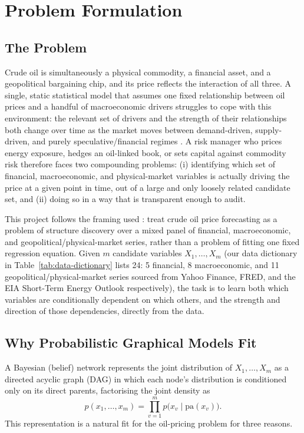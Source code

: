 \section{Problem Formulation}
\label{sec:problem-formulation}

\subsection{The Problem}

Crude oil is simultaneously a physical commodity, a financial asset, and a
geopolitical bargaining chip, and its price reflects the interaction of all
three. A single, static statistical model that assumes one fixed relationship
between oil prices and a handful of macroeconomic drivers struggles to cope
with this environment: the relevant set of drivers and the strength of their relationships both change over time as the market
moves between demand-driven, supply-driven, and purely speculative/financial
regimes \autocite{kilian2009oil,hamilton2009causes}. A risk manager who prices
energy exposure, hedges an oil-linked book, or sets capital against commodity
risk therefore faces two compounding problems: (i) identifying which set of financial, macroeconomic, and physical-market variables is actually
driving the price at a given point in time, out of a large and only loosely
related candidate set, and (ii) doing so in a way that is transparent enough
to audit.

This project follows the framing used \cite{alvi2018pgm}: treat crude oil price forecasting as a problem of structure discovery over a mixed panel of financial, macroeconomic, and geopolitical/physical-market series, rather than a problem of fitting one fixed regression equation. Given
$m$ candidate variables $X_1, \ldots, X_m$ (our data dictionary in Table~\ref{tab:data-dictionary} lists 24: 5 financial, 8 macroeconomic, and 11 geopolitical/physical-market series sourced from Yahoo Finance, FRED, and the EIA Short-Term Energy Outlook respectively), the task is to learn both which variables are conditionally dependent on which others, and the strength and direction of those dependencies, directly from the data.

\subsection{Why Probabilistic Graphical Models Fit}

A Bayesian (belief) network represents the joint distribution of
$X_1, \ldots, X_m$ as a directed acyclic graph (DAG) in which each node's distribution is conditioned only on its direct parents, factorising the joint density as
\[
  p(x_1, \ldots, x_m) = \prod_{v=1}^{m} p\bigl(x_v \mid \mathrm{pa}(x_v)\bigr).
\]
This representation is a natural fit for the oil-pricing problem for three
reasons.

